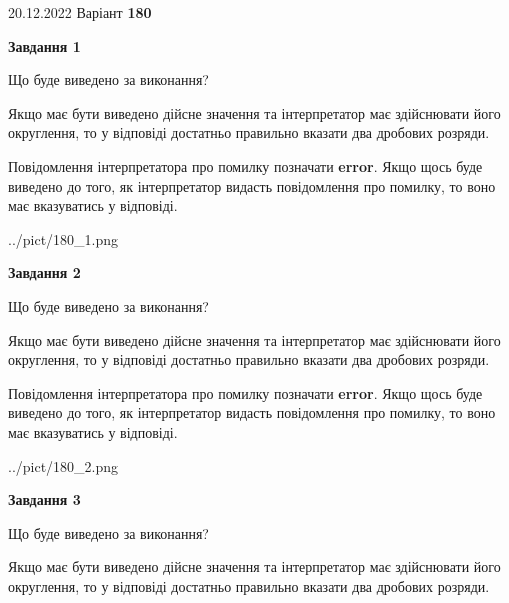 \documentclass[12pt, ukrainian]{article}
\begin{document}
{20.12.2022 Варіант \No \textbf { 180 }\par}
{
\begin {Large}

{\begin {center}\textbf{Завдання 1}\end {center}}\par
Що буде виведено за виконання? \par

Якщо має бути виведено дійсне значення та інтерпретатор має здійснювати його округлення, 
то у відповіді достатньо правильно вказати два дробових розряди.

Повідомлення інтерпретатора про помилку позначати \textbf{error}.
Якщо щось буде виведено до того, як інтерпретатор видасть повідомлення про помилку, 
то воно має вказуватись у відповіді. \par

\begin{center}
	{../pict/180_1.png}
\end{center}
\newpage

{\begin {center}\textbf{Завдання 2}\end {center}}\par
Що буде виведено за виконання? \par

Якщо має бути виведено дійсне значення та інтерпретатор має здійснювати його округлення, 
то у відповіді достатньо правильно вказати два дробових розряди.

Повідомлення інтерпретатора про помилку позначати \textbf{error}.
Якщо щось буде виведено до того, як інтерпретатор видасть повідомлення про помилку, 
то воно має вказуватись у відповіді. \par

\begin{center}
	{../pict/180_2.png}
\end{center}
\newpage

{\begin {center}\textbf{Завдання 3}\end {center}}\par
Що буде виведено за виконання? \par

Якщо має бути виведено дійсне значення та інтерпретатор має здійснювати його округлення, 
то у відповіді достатньо правильно вказати два дробових розряди.


\end{Large}}
\end{document}
